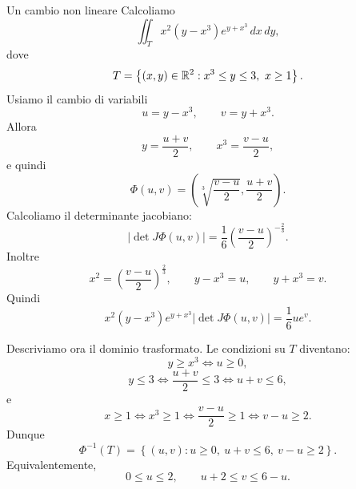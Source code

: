 \documentclass[a4paper]{article}
\begin{document}
\begin{snippetexample}{Un cambio non lineare}
    Calcoliamo
    \[
        \iint_T x^2(y-x^3)e^{y+x^3}\,dx\,dy,
    \]
    dove
    \[
        T=
        \left\{
            (x,y)\in\mathbb{R}^2:
            x^3\leq y\leq 3,\ x\geq 1
        \right\}.
    \]
    Usiamo il cambio di variabili
    \[
        u=y-x^3,
        \qquad
        v=y+x^3.
    \]
    Allora
    \[
        y=\frac{u+v}{2},
        \qquad
        x^3=\frac{v-u}{2},
    \]
    e quindi
    \[
        \Phi(u,v)
        =
        \left(
            \sqrt[3]{\frac{v-u}{2}},
            \frac{u+v}{2}
        \right).
    \]
    Calcoliamo il determinante jacobiano:
    \[
        \left|\det J\Phi(u,v)\right|
        =
        \frac{1}{6}
        \left(\frac{v-u}{2}\right)^{-\frac{2}{3}}.
    \]
    Inoltre
    \[
        x^2=
        \left(\frac{v-u}{2}\right)^{\frac{2}{3}},
        \qquad
        y-x^3=u,
        \qquad
        y+x^3=v.
    \]
    Quindi
    \[
        x^2(y-x^3)e^{y+x^3}
        \left|\det J\Phi(u,v)\right|
        =
        \frac{1}{6}ue^v.
    \]

    Descriviamo ora il dominio trasformato. Le condizioni su \(T\) diventano:
    \[
        y\geq x^3 \iff u\geq 0,
    \]
    \[
        y\leq 3 \iff \frac{u+v}{2}\leq 3 \iff u+v\leq 6,
    \]
    e
    \[
        x\geq 1 \iff x^3\geq 1 \iff \frac{v-u}{2}\geq 1 \iff v-u\geq 2.
    \]
    Dunque
    \[
        \Phi^{-1}(T)
        =
        \left\{
            (u,v):
            u\geq 0,\ u+v\leq 6,\ v-u\geq 2
        \right\}.
    \]
    Equivalentemente,
    \[
        0\leq u\leq 2,
        \qquad
        u+2\leq v\leq 6-u.
    \]

    \begin{center}
    \end{center}


\end{snippetexample}
\end{document}
